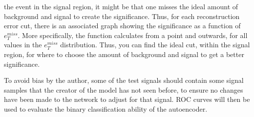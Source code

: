 the event in the signal region, it might be that one misses the ideal amount of background and signal to create 
the significance. Thus, for each reconstruction error cut, there is an associated graph showing the significance 
as a function of $e_T^{miss}$. More specifically, the function calculates from a point and outwards, for all 
values in the $e_T^{miss}$ distribution. Thus, you can find the ideal cut, within the signal region, for where to 
choose the amount of background and signal to get a better significance.\par 
To avoid bias by the author, some of the test signals should contain some signal samples that the creator of the 
model has not seen before, to ensure no changes have been made to the network to adjust for that signal. ROC 
curves will then be used to evaluate the binary classification ability of the autoencoder. \par 
